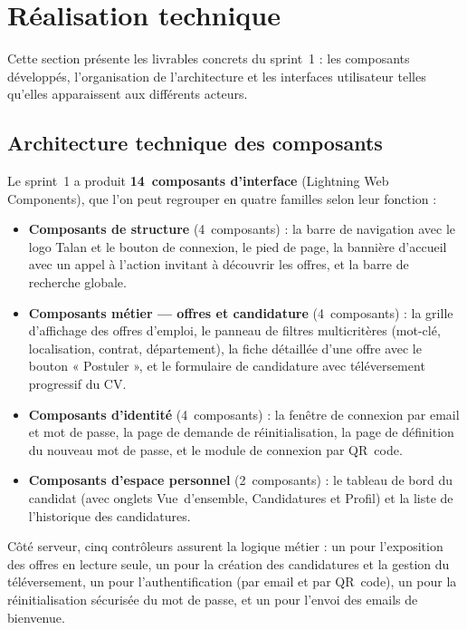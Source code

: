\section{Réalisation technique}

Cette section présente les livrables concrets du sprint~1 : les composants développés, l'organisation de l'architecture et les interfaces utilisateur telles qu'elles apparaissent aux différents acteurs.

\subsection{Architecture technique des composants}

Le sprint~1 a produit \textbf{14~composants d'interface} (Lightning Web Components), que l'on peut regrouper en quatre familles selon leur fonction :

\begin{itemize}
    \item \textbf{Composants de structure} (4~composants) : la barre de navigation avec le logo Talan et le bouton de connexion, le pied de page, la bannière d'accueil avec un appel à l'action invitant à découvrir les offres, et la barre de recherche globale.
    
    \item \textbf{Composants métier --- offres et candidature} (4~composants) : la grille d'affichage des offres d'emploi, le panneau de filtres multicritères (mot-clé, localisation, contrat, département), la fiche détaillée d'une offre avec le bouton « Postuler », et le formulaire de candidature avec téléversement progressif du CV.
    
    \item \textbf{Composants d'identité} (4~composants) : la fenêtre de connexion par email et mot de passe, la page de demande de réinitialisation, la page de définition du nouveau mot de passe, et le module de connexion par QR~code.
    
    \item \textbf{Composants d'espace personnel} (2~composants) : le tableau de bord du candidat (avec onglets Vue~d'ensemble, Candidatures et Profil) et la liste de l'historique des candidatures.
\end{itemize}

\medskip

Côté serveur, cinq contrôleurs assurent la logique métier : un pour l'exposition des offres en lecture seule, un pour la création des candidatures et la gestion du téléversement, un pour l'authentification (par email et par QR~code), un pour la réinitialisation sécurisée du mot de passe, et un pour l'envoi des emails de bienvenue.

